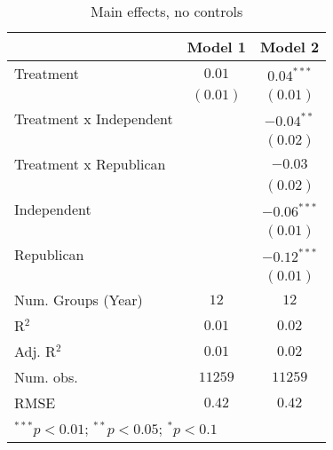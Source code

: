 
\begin{table}
\caption{Main effects, no controls}
\begin{center}
\begin{tabular}{l c c}
\toprule
 & Model 1 & Model 2 \\
\midrule
Treatment               & $0.01$   & $0.04^{***}$  \\
                        & $(0.01)$ & $(0.01)$      \\
Treatment x Independent &          & $-0.04^{**}$  \\
                        &          & $(0.02)$      \\
Treatment x Republican  &          & $-0.03$       \\
                        &          & $(0.02)$      \\
Independent             &          & $-0.06^{***}$ \\
                        &          & $(0.01)$      \\
Republican              &          & $-0.12^{***}$ \\
                        &          & $(0.01)$      \\
\midrule
Num. Groups (Year)      & $12$     & $12$          \\
R$^2$                   & $0.01$   & $0.02$        \\
Adj. R$^2$              & $0.01$   & $0.02$        \\
Num. obs.               & $11259$  & $11259$       \\
RMSE                    & $0.42$   & $0.42$        \\
\bottomrule
\multicolumn{3}{l}{\scriptsize{$^{***}p<0.01$; $^{**}p<0.05$; $^{*}p<0.1$}}
\end{tabular}
\label{table_ate_no_controls}
\end{center}
\end{table}
